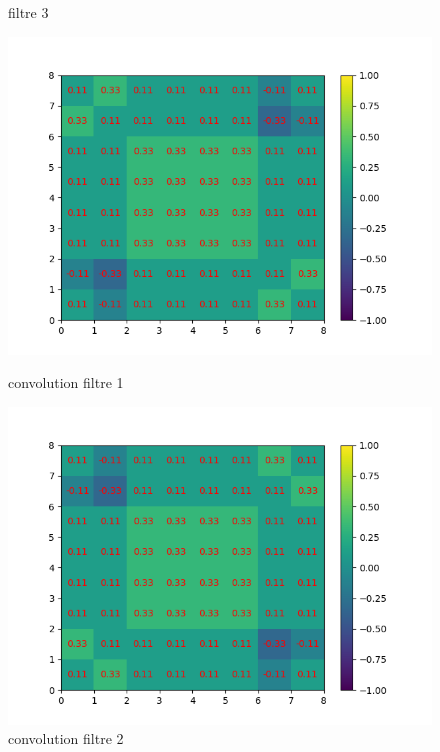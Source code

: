 \begin{figure}[!htb]
        \caption{filtre 3}
    \endminipage
\end{figure}


\begin{figure}[h]
        \includegraphics[width=\textwidth]{img/cnn_exemple/square/convolution_filtre_1.png}
        \caption{convolution filtre 1}
    \endminipage\hfill
        \includegraphics[width=\textwidth]{img/cnn_exemple/square/convolution_filtre_2.png}
        \caption{convolution filtre 2}
    \endminipage\hfill

\end{figure}
